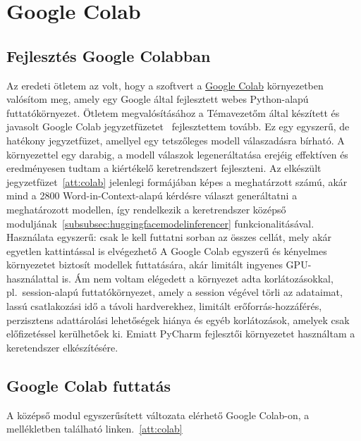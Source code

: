 \documentclass[12pt]{report}
\begin{document}
    \chapter{Google Colab}


    \section{Fejlesztés Google Colabban}
    Az eredeti ötletem az volt, hogy a szoftvert a \href{https://colab.research.google.com}{Google Colab} környezetben valósítom meg, amely egy Google által fejlesztett webes Python-alapú futtatókörnyezet.
    Ötletem megvalósításához a Témavezetőm által készített és javasolt Google Colab jegyzetfüzetet~\cite{berend2025phi} fejlesztettem tovább.
    Ez egy egyszerű, de hatékony jegyzetfüzet, amellyel egy tetszőleges modell válaszadásra bírható.
    A környezettel egy darabig, a modell válaszok legeneráltatása erejéig effektíven és eredményesen tudtam a kiértékelő keretrendszert fejleszteni.
    Az elkészült jegyzetfüzet~\ref{att:colab} jelenlegi formájában képes a meghatárzott számú, akár mind a 2800 Word-in-Context-alapú kérdésre választ generáltatni a meghatározott modellen, így rendelkezik a keretrendszer középső moduljának~\ref{subsubsec:huggingfacemodelinferencer} funkcionalitásával.
    Használata egyszerű: csak le kell futtatni sorban az összes cellát, mely akár egyetlen kattintással is elvégezhető
    A Google Colab egyszerű és kényelmes környezetet biztosít modellek futtatására, akár limitált ingyenes GPU-használattal is.
    Ám nem voltam elégedett a környezet adta korlátozásokkal, pl.\ session-alapú futtatókörnyezet, amely a session végével törli az adataimat, lassú csatlakozási idő a távoli hardverekhez, limitált erőforrás-hozzáférés, perzisztens adattárolási lehetőségek hiánya és egyéb korlátozások, amelyek csak előfizetéssel kerülhetőek ki.
    Emiatt PyCharm fejlesztői környezetet használtam a keretendszer elkészítésére.

    \section{Google Colab futtatás}
    A középső modul egyszerűsített változata elérhető Google Colab-on, a mellékletben található linken.~\ref{att:colab}
\end{document}
